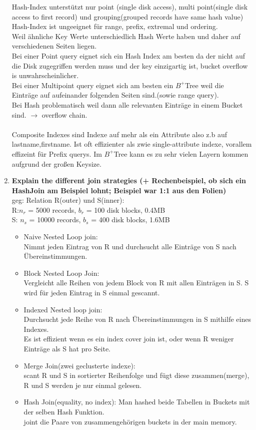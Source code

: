 \documentclass[12pt]{article}\pagestyle{myheadings}
\theoremstyle{plain}
\begin{document}
\begin{enumerate}
Hash-Index unterstützt nur point (single disk access), multi point(single disk access to first record) und grouping(grouped records have same hash value)\\
Hash-Index ist ungeeignet  für range, prefix, extremal und ordering.\\
Weil ähnliche Key Werte unterschiedlich Hash Werte haben und daher auf verschiedenen Seiten liegen.\\
Bei einer Point query eignet sich ein Hash Index am besten da der nicht auf die Disk zugegriffen werden muss und der key einzigartig ist, bucket overflow is unwahrscheinlicher.\\
Bei einer Multipoint query eignet sich am besten ein $B^+$Tree weil die Einträge auf aufeinander folgenden Seiten sind.(sowie range query). \\Bei Hash problematisch weil dann alle relevanten Einträge in einem Bucket sind. $\rightarrow$ overflow chain.\\ \\
Composite Indexes sind Indexe auf mehr als ein Attribute also z.b auf lastname,firstname.
Ist oft effizienter als zwie single-attribute indexe, vorallem effizeint für Prefix querys.
Im $B^+$Tree kann es zu sehr vielen Layern kommen aufgrund der großen Keysize.

\item \textbf{Explain the different join strategies (+ Rechenbeispiel, ob sich ein HashJoin am Beispiel lohnt; Beispiel war
1:1 aus den Folien)}\\

geg: Relation R(outer) und S(inner):\\
R:$ n_{r}$ = 5000 records, $b_{r}$ = 100 disk blocks, 0.4MB\\
S: $n_{s}$ = 10000 records, $b_{s}$ = 400 disk blocks, 1.6MB
\begin{itemize}
\item Naive Nested Loop join:\\
Nimmt jeden Eintrag von R und durchsucht alle Einträge von S nach Übereinstimmungen.
\item Block Nested Loop Join:\\
Vergleicht alle Reihen von jedem Block von R mit allen Einträgen in S.
S wird für jeden Eintrag in S einmal gescannt.
\item Indexed Nested loop join: \\Durchsucht jede  Reihe von R nach Übereinstimmungen in S mithilfe eines Indexes.\\
Es ist effizient wenn es ein index cover join ist, oder wenn R weniger Einträge als S hat pro Seite.
\item Merge Join(zwei geclusterte indexe):\\
scant R und S in sortierter Reihenfolge und fügt diese zusammen(merge), R und S werden je nur einmal gelesen.
\item Hash Join(equality, no index):
Man hashed beide Tabellen in Buckets mit der selben Hash Funktion.\\
joint die Paare von zusammengehörigen buckets in der main memory.


\end{itemize}
\end{enumerate}
\end{document}

